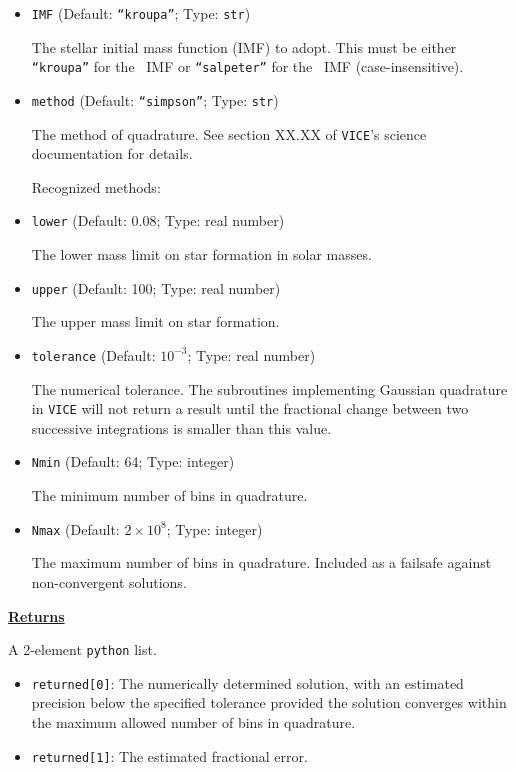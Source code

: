 \documentclass{report}
\begin{document}
\begin{itemize}
	\item{
		\texttt{IMF} (Default: \texttt{``kroupa''}; Type: \texttt{str}) 
		\par
		The stellar initial mass function (IMF) to adopt. This must be either 
		\texttt{``kroupa''} for the~\citet{Kroupa2001} IMF or 
		\texttt{``salpeter''} for the~\citet{Salpeter1955} IMF 
		(case-insensitive). 
	}

	\item{
		\texttt{method} (Default: \texttt{``simpson''}; Type: \texttt{str}) 
		\par 
		The method of quadrature. See section XX.XX of \texttt{VICE}'s 
		science documentation for details.  
		\par
		Recognized methods: 
	}

	\item{
		\texttt{lower} (Default: 0.08; Type: real number) 
		\par
		The lower mass limit on star formation in solar masses. 
	}

	\item{
		\texttt{upper} (Default: 100; Type: real number) 
		\par
		The upper mass limit on star formation. 
	}

	\item{
		\texttt{tolerance} (Default: $10^{-3}$; Type: real number) 
		\par
		The numerical tolerance. The subroutines implementing Gaussian 
		quadrature in \texttt{VICE} will not return a result until the 
		fractional change between two successive integrations is smaller than 
		this value. 
	}

	\item{
		\texttt{Nmin} (Default: 64; Type: integer) 
		\par
		The minimum number of bins in quadrature. 
	}

	\item{
		\texttt{Nmax} (Default: $2\times10^8$; Type: integer) 
		\par
		The maximum number of bins in quadrature. Included as a failsafe 
		against non-convergent solutions. 
	}
\end{itemize}

\null\par\noindent 
\underline{\textbf{Returns}} 
\par\noindent 
A 2-element \texttt{python} list. 
\par\noindent
\begin{itemize} 
	\item{
		\texttt{returned[0]}: The numerically determined solution, with an 
		estimated precision below the specified tolerance provided the 
		solution converges within the maximum allowed number of bins in 
		quadrature. 
	}

	\item{
		\texttt{returned[1]}: The estimated fractional error. 
	}
\end{itemize}
\end{document}
